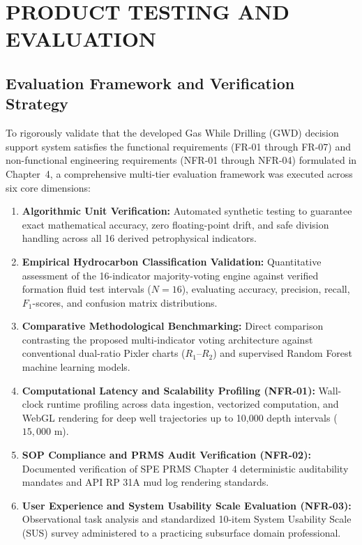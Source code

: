 \chapter{PRODUCT TESTING AND EVALUATION}

\section{Evaluation Framework and Verification Strategy}

To rigorously validate that the developed Gas While Drilling (GWD) decision support system satisfies the functional requirements (FR-01 through FR-07) and non-functional engineering requirements (NFR-01 through NFR-04) formulated in Chapter~4, a comprehensive multi-tier evaluation framework was executed across six core dimensions:

\begin{enumerate}
    \item \textbf{Algorithmic Unit Verification:} Automated synthetic testing to guarantee exact mathematical accuracy, zero floating-point drift, and safe division handling across all 16 derived petrophysical indicators.
    \item \textbf{Empirical Hydrocarbon Classification Validation:} Quantitative assessment of the 16-indicator majority-voting engine against verified formation fluid test intervals ($N=16$), evaluating accuracy, precision, recall, $F_1$-scores, and confusion matrix distributions.
    \item \textbf{Comparative Methodological Benchmarking:} Direct comparison contrasting the proposed multi-indicator voting architecture against conventional dual-ratio Pixler charts ($R_1$--$R_2$) and supervised Random Forest machine learning models.
    \item \textbf{Computational Latency and Scalability Profiling (NFR-01):} Wall-clock runtime profiling across data ingestion, vectorized computation, and WebGL rendering for deep well trajectories up to 10,000 depth intervals ($15,000\text{ m}$).
    \item \textbf{SOP Compliance and PRMS Audit Verification (NFR-02):} Documented verification of SPE PRMS Chapter 4 deterministic auditability mandates and API RP 31A mud log rendering standards.
    \item \textbf{User Experience and System Usability Scale Evaluation (NFR-03):} Observational task analysis and standardized 10-item System Usability Scale (SUS) survey administered to a practicing subsurface domain professional.
\end{enumerate}

